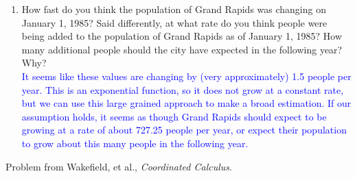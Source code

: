 \documentclass{ximera}
\begin{document}
\begin{exercise}
\begin{enumerate}
{        For $[5,8]$:\\
        $\frac{P(8)-P(5)}{8-5}=\frac{187639.06-185444.20}{3}=731.62$ people per year\\
        For $[5,7]$:\\
        $\frac{P(7)-P(5)}{7-5}=\frac{186904.57-185444.20}{2}=730.18$ people per year\\
        For $[5,6]$:\\
        $\frac{P(6)-P(5)}{6-5}=\frac{186172.94-185444.20}{1}=728.74$ people per year\\}
        \item How fast do you think the population of Grand Rapids was changing on January 1, 1985? Said differently, at what rate do you think people were being added to the population of Grand Rapids as of January 1, 1985? How many additional people should the city have expected in the following year? Why?\\
        \textcolor{blue}{It seems like these values are changing by (very approximately) 1.5 people per year.  This is an exponential function, so it does not grow at a constant rate, but we can use this large grained approach to make a broad estimation.  If our assumption holds, it seems as though Grand Rapids should expect to be growing at a rate of about 727.25 people per year, or expect their population to grow about this many people in the following year.}
  \end{enumerate}
  Problem from Wakefield, et al., \textit {Coordinated Calculus}.
\end{exercise}
\end{document}
